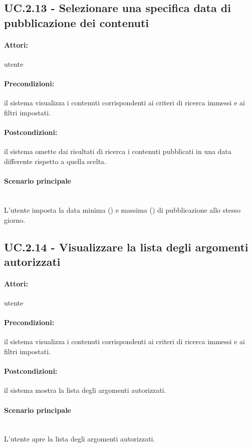 \documentclass[10pt,a4paper,headinclude,footinclude,hidelinks]{scrreprt} %
\begin{document}
	\subsection[UC.2.13]{UC.2.13 - Selezionare una specifica data di pubblicazione dei contenuti}
	\label{sec:stage:ar:uc:2_13}
	\paragraph{Attori:} utente
	\paragraph{Precondizioni:} il sistema visualizza i contenuti corrispondenti ai criteri di ricerca immessi e ai filtri impostati.
	\paragraph{Postcondizioni:} il sistema omette dai risultati di ricerca i contenuti pubblicati in una data differente rispetto a quella scelta.
	\paragraph{Scenario principale} \hfill \\
	L'utente imposta la data minima () e massima () di pubblicazione allo stesso giorno.

	\subsection[UC.2.14]{UC.2.14 - Visualizzare la lista degli argomenti autorizzati}
	\label{sec:stage:ar:uc:2_14}
	\paragraph{Attori:} utente
	\paragraph{Precondizioni:} il sistema visualizza i contenuti corrispondenti ai criteri di ricerca immessi e ai filtri impostati.
	\paragraph{Postcondizioni:} il sistema mostra la lista degli argomenti autorizzati.
	\paragraph{Scenario principale} \hfill \\
	L'utente apre la lista degli argomenti autorizzati.
\end{document}
